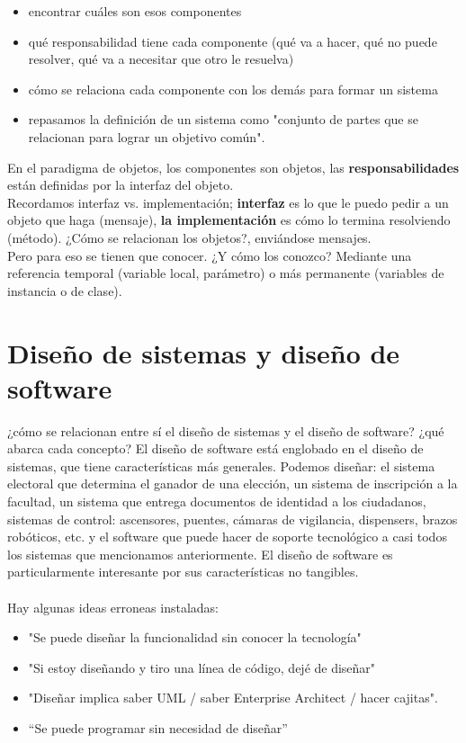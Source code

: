 \documentclass[12pt]{book}
\begin{document}
\begin{itemize}
\item encontrar cuáles son esos componentes 
\item qué responsabilidad tiene cada componente (qué va a hacer, qué no puede resolver, qué va a necesitar que otro le resuelva)
\item cómo se relaciona cada componente con los demás para formar un sistema
\item repasamos la definición de un sistema como "conjunto de partes que se relacionan para lograr un objetivo común".
\end{itemize}
En el paradigma de objetos, los componentes son objetos, las \textbf{responsabilidades} están definidas por la interfaz del objeto. 
\\
Recordamos interfaz vs. implementación; \textbf{interfaz} es lo que le puedo pedir a un objeto que haga (mensaje), \textbf{la implementación} es cómo lo termina resolviendo (método). 
¿Cómo se relacionan los objetos?, enviándose mensajes. 
\\
Pero para eso se tienen que conocer. ¿Y cómo los conozco? Mediante una referencia temporal (variable local, parámetro) o más permanente (variables de instancia o de clase).

\section{Diseño de sistemas y diseño de software}
¿cómo se relacionan entre sí el diseño de sistemas y el diseño de software? ¿qué abarca cada concepto?
El diseño de software está englobado en el diseño de sistemas, que tiene características más generales. Podemos diseñar: el sistema electoral que determina el ganador de una elección, un sistema de inscripción a la facultad, un sistema que entrega documentos de identidad a los ciudadanos,
sistemas de control: ascensores, puentes, cámaras de vigilancia, dispensers, brazos robóticos, etc.
y el software que puede hacer de soporte tecnológico a casi todos los sistemas que mencionamos anteriormente. 
El diseño de software es particularmente interesante por sus características no tangibles.
\\
\\
Hay algunas ideas erroneas instaladas:
\begin{itemize}
\item "Se puede diseñar la funcionalidad sin conocer la tecnología" 
\item "Si estoy diseñando y tiro una línea de código, dejé de diseñar"
\item "Diseñar implica saber UML / saber Enterprise Architect / hacer cajitas".
\item “Se puede programar sin necesidad de diseñar”
\end{itemize}
\end{document}
